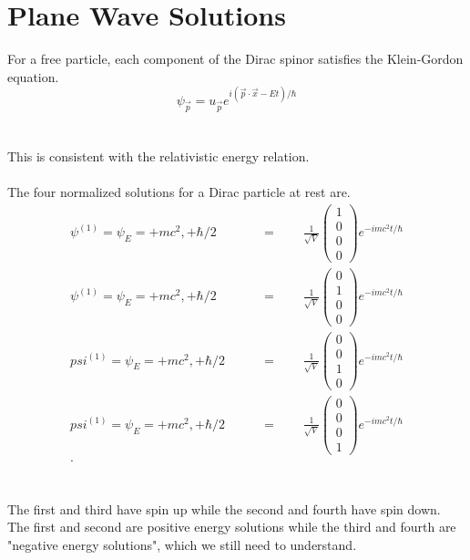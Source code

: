 \documentclass{report}
\begin{document}
\section{Plane Wave Solutions}
For a free particle, each component of the Dirac spinor satisfies the Klein-Gordon equation.
\begin{equation}
	\psi_{\vec{p}} = u_{\vec{p}}e^{i \left( \vec{p} \cdot \vec{x} - Et \right) / \hbar }
\end{equation} \\ \\
This is consistent with the relativistic energy relation. \\ \\
The four normalized solutions for a Dirac particle at rest are.
\begin{align*}
	\psi^{(1)} = \psi_{E} = +mc^2, + \hbar / 2 \qquad & = \qquad \frac{1}{\sqrt{V} } \begin{pmatrix} 1 \\ 0 \\ 0 \\ 0 \end{pmatrix} e^{-i mc^2 t / \hbar} \\
	\psi^{(1)} = \psi_{E} = +mc^2, + \hbar / 2 \qquad & = \qquad \frac{1}{\sqrt{V} } \begin{pmatrix} 0 \\ 1 \\ 0 \\ 0 \end{pmatrix} e^{-i mc^2 t / \hbar} \\
	psi^{(1)} = \psi_{E} = +mc^2, + \hbar / 2 \qquad  & = \qquad \frac{1}{\sqrt{V} } \begin{pmatrix} 0 \\ 0 \\ 1 \\ 0 \end{pmatrix} e^{-i mc^2 t / \hbar} \\
	psi^{(1)} = \psi_{E} = +mc^2, + \hbar / 2 \qquad  & = \qquad \frac{1}{\sqrt{V} } \begin{pmatrix} 0 \\ 0 \\ 0 \\ 1 \end{pmatrix} e^{-i mc^2 t / \hbar} \\
	.\end{align*} \\ \\
The first and third have spin up while the second and fourth have spin down. The first and second are positive energy solutions while the third and fourth are "negative energy solutions", which we still need to understand. \\ \\
\end{document}
